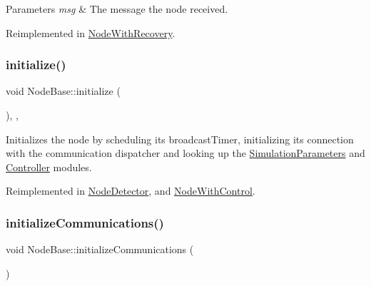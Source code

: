 \begin{DoxyParams}{Parameters}
{\em msg} & The message the node received. \\
\hline
\end{DoxyParams}


Reimplemented in \hyperlink{class_node_with_recovery_a901c89606b84898e13fe8a66228acd9f}{Node\+With\+Recovery}.

\mbox{\label{class_node_base_af7910c39553111295b66c88742d1198a}} 
\subsubsection{\texorpdfstring{initialize()}{initialize()}}
{\footnotesize\ttfamily void Node\+Base\+::initialize (\begin{DoxyParamCaption}{ }\end{DoxyParamCaption})\hspace{0.3cm}{\ttfamily [override]}, {\ttfamily [protected]}, {\ttfamily [virtual]}}



Initializes the node by scheduling it\textquotesingle{}s broadcast\+Timer, initializing its connection with the communication dispatcher and looking up the \hyperlink{class_simulation_parameters}{Simulation\+Parameters} and \hyperlink{class_controller}{Controller} modules. 



Reimplemented in \hyperlink{class_node_detector_aefa188ab0657837b1b57f24674d3ef22}{Node\+Detector}, and \hyperlink{class_node_with_control_a08c8e80fd67b52c51c642d7c66fe729c}{Node\+With\+Control}.

\mbox{\label{class_node_base_a2077b2a599f55050603268dbf8fff6a7}} 
\subsubsection{\texorpdfstring{initialize\+Communications()}{initializeCommunications()}}
{\footnotesize\ttfamily void Node\+Base\+::initialize\+Communications (\begin{DoxyParamCaption}{ }\end{DoxyParamCaption})\hspace{0.3cm}{\ttfamily [protected]}}



